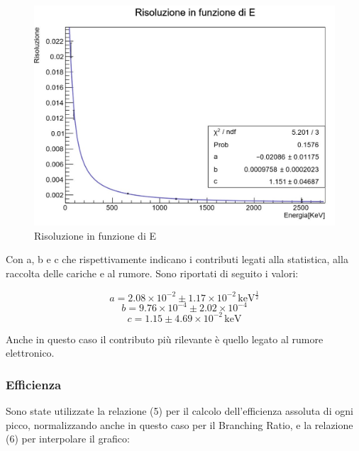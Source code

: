 \documentclass[a4paper,10pt]{article}
\newcommand*{\unit}[1]{\ensuremath{\mathrm{\,#1}}}
\begin{document}
\begin{figure}[H]
    \centering
    \includegraphics[scale=0.45]{grafici/risoluzionemultigamma}
    \caption{Risoluzione in funzione di E}
\end{figure}

\noindent Con a, b e c che rispettivamente indicano i contributi legati alla statistica, alla raccolta delle cariche e al rumore. Sono riportati di seguito i valori:

$$
	a=2.08 \times 10^{-2} \pm 1.17 \times 10^{-2} \unit{keV^{\frac{1}{2}}}
$$
$$
	b=9.76 \times 10^{-4} \pm 2.02 \times 10^{-4}
$$
$$
	c= 1.15 \pm 4.69 \times 10^{-2} \unit{keV}
$$

\noindent Anche in questo caso il contributo pi\`u rilevante \`e quello legato al rumore elettronico.


\subsubsection{Efficienza}
Sono state utilizzate la relazione (5) per il calcolo dell'efficienza assoluta di ogni picco, normalizzando anche in questo caso per il Branching Ratio, e la relazione (6) per interpolare il grafico:
\end{document}
